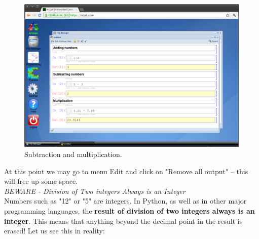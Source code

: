 \documentclass[article,A4,12pt]{llncs}
\begin{document}
\begin{figure}[!ht]
\begin{center}
\includegraphics[width=\textwidth]{img/1p3r2.png}
\end{center}
\caption{Subtraction and multiplication.}
\label{fig:1p3r2}
\end{figure}
\noindent
At this point we may go to menu Edit and click on 
"Remove all output" -- this will free up some space.\\

\noindent
{\em BEWARE - Division of Two integers Always is an Integer}\\

Numbers such as "12" or "5" are integers. In Python, as well as 
in other major programming languages, the {\bf result of division of 
two integers always is an integer}. This means that anything beyond 
the decimal point in the result is erased! Let us see this in reality:
\end{document}
